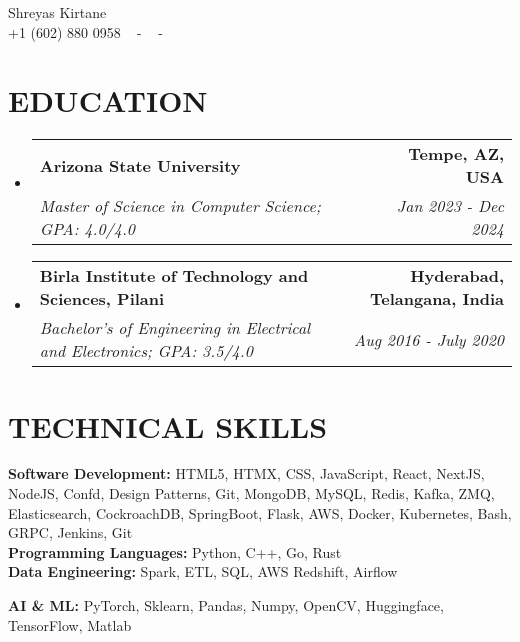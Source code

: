 \documentclass[letterpaper,11pt]{article}
\makeatletter
\newcommand{\resumeSubheading}[4]{
  \vspace{-2pt}\item
    \begin{tabular*}{1.0\textwidth}[t]{l@{\extracolsep{\fill}}r}
      \textbf{\large#1} & \textbf{\small #2} \\
      \textit{\large#3} & \textit{\small #4} \\
      
    \end{tabular*}\vspace{-7pt}
}
\newcommand{\resumeSubHeadingListStart}{\begin{itemize}[leftmargin=0.0in, label={}]}
\newcommand{\resumeSubHeadingListEnd}{\end{itemize}}
\makeatother
\begin{document}


\begin{center}
    {\huge Shreyas Kirtane} \\ \vspace{2pt} 
    {+1 (602) 880 0958} ~ 
    \small{-}
    \href{mailto:[enter your email id]}{\color{blue}{skirtan1@asu.edu}} ~ 
    \small{-}
    \href{[url to linkedin profile]}{ \color{blue}{linkedin.com/in/shreyas-kirtane-760768179}}  ~
    \vspace{-7pt}
\end{center}

\section{\color{airforceblue}EDUCATION}
  \resumeSubHeadingListStart
    \resumeSubheading
      {Arizona State University}{Tempe, AZ, USA}
      {Master of Science in Computer Science; GPA: 4.0/4.0}{Jan 2023 - Dec 2024}
    \vspace{-4pt}
     \resumeSubheading
      {Birla Institute of Technology and Sciences, Pilani}{Hyderabad, Telangana, India}
      {Bachelor's of Engineering in Electrical and Electronics; GPA: 3.5/4.0}{Aug 2016 - July 2020}
  \resumeSubHeadingListEnd
  \vspace{-10pt}

\section{\color{airforceblue}TECHNICAL SKILLS}
 \begin{itemize}[leftmargin=0in, label={}]
    \small{\item{
    
        \textbf{\normalsize{Software Development:}}{ \normalsize{HTML5, HTMX, CSS, JavaScript, React, NextJS, NodeJS, Confd, Design Patterns, Git, MongoDB, MySQL, Redis, Kafka, ZMQ, Elasticsearch, CockroachDB, SpringBoot, Flask, AWS, Docker, Kubernetes, Bash, GRPC, Jenkins, Git}} \\
          \vspace{1.2pt}
     \textbf{\normalsize{Programming Languages:}}{ \normalsize{Python, C++, Go, Rust}} \\
      \vspace{1.2pt}
      \textbf{\normalsize{Data Engineering:}}{ \normalsize{Spark, ETL, SQL, AWS Redshift, Airflow}} \\
      \vspace{1.2pt}
      
     \textbf{\normalsize{AI \& ML:}}{ \normalsize{PyTorch,  Sklearn, Pandas, Numpy, OpenCV, Huggingface, TensorFlow, Matlab}} \\
      \vspace{1.2pt}
     }}
 \end{itemize}
 \vspace{-16pt}
 
\end{document}
